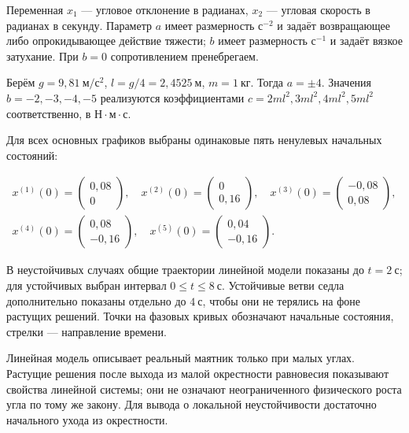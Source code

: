 \documentclass[a4paper,14pt]{extarticle}
\begin{document}
Переменная $x_1$ — угловое отклонение в радианах, $x_2$ — угловая скорость в радианах в секунду. Параметр $a$ имеет размерность $\mathrm{с}^{-2}$ и задаёт возвращающее либо опрокидывающее действие тяжести; $b$ имеет размерность $\mathrm{с}^{-1}$ и задаёт вязкое затухание. При $b=0$ сопротивлением пренебрегаем.

Берём $g=9{,}81\ \mathrm{м/с^2}$, $l=g/4=2{,}4525\ \mathrm{м}$, $m=1\ \mathrm{кг}$. Тогда $a=\pm4$. Значения $b=-2,-3,-4,-5$ реализуются коэффициентами $c=2ml^2,3ml^2,4ml^2,5ml^2$ соответственно, в $\mathrm{Н\cdot м\cdot с}$.

Для всех основных графиков выбраны одинаковые пять ненулевых начальных состояний:

\begin{equation}
\begin{gathered}
x^{(1)}(0)=\begin{pmatrix}0{,}08\\0\end{pmatrix},\quad
x^{(2)}(0)=\begin{pmatrix}0\\0{,}16\end{pmatrix},\quad
x^{(3)}(0)=\begin{pmatrix}-0{,}08\\0{,}08\end{pmatrix},\\[6pt]
x^{(4)}(0)=\begin{pmatrix}0{,}08\\-0{,}16\end{pmatrix},\quad
x^{(5)}(0)=\begin{pmatrix}0{,}04\\-0{,}16\end{pmatrix}.
\end{gathered}
\end{equation}

В неустойчивых случаях общие траектории линейной модели показаны до $t=2\ \mathrm{с}$; для устойчивых выбран интервал $0\leq t\leq8\ \mathrm{с}$. Устойчивые ветви седла дополнительно показаны отдельно до $4\ \mathrm{с}$, чтобы они не терялись на фоне растущих решений. Точки на фазовых кривых обозначают начальные состояния, стрелки — направление времени.

Линейная модель описывает реальный маятник только при малых углах. Растущие решения после выхода из малой окрестности равновесия показывают свойства линейной системы; они не означают неограниченного физического роста угла по тому же закону. Для вывода о локальной неустойчивости достаточно начального ухода из окрестности.
\end{document}

